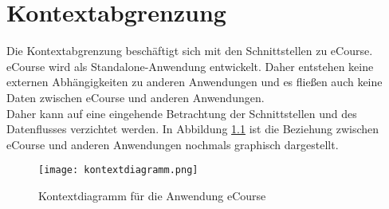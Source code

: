 
\chapter{Kontextabgrenzung}
\label{sec:kontext}
Die Kontextabgrenzung beschäftigt sich mit den Schnittstellen zu eCourse.
eCourse wird als \gls{Standalone}-Anwendung entwickelt. Daher entstehen keine externen Abhängigkeiten zu anderen Anwendungen und es fließen auch keine Daten zwischen eCourse und anderen Anwendungen. \\
Daher kann auf eine eingehende Betrachtung der Schnittstellen und des Datenflusses verzichtet werden. In Abbildung \ref{fib:Kontext} ist die Beziehung zwischen eCourse und anderen Anwendungen nochmals graphisch dargestellt. 
\begin{figure}[H]
\centering
\texttt{[image: kontextdiagramm.png]}
\caption{Kontextdiagramm für die Anwendung eCourse}
\label{fib:Kontext}
\end{figure}